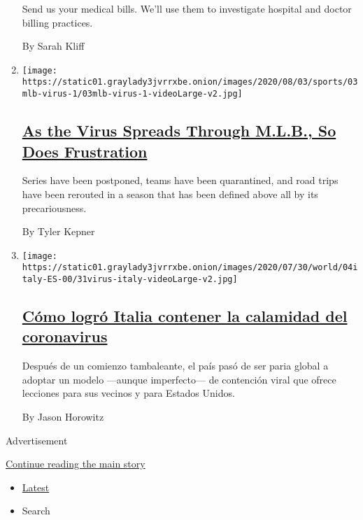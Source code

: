 \begin{enumerate}
  Send us your medical bills. We'll use them to investigate hospital and
  doctor billing practices.

  By Sarah Kliff
\item
  \texttt{[image: https://static01.graylady3jvrrxbe.onion/images/2020/08/03/sports/03mlb-virus-1/03mlb-virus-1-videoLarge-v2.jpg]}

  \hypertarget{as-the-virus-spreads-through-mlb-so-does-frustration}{%
  \subsection{\texorpdfstring{\href{/2020/08/03/sports/baseball/mlb-coronavirus-outbreak.html}{As
  the Virus Spreads Through M.L.B., So Does
  Frustration}}{As the Virus Spreads Through M.L.B., So Does Frustration}}\label{as-the-virus-spreads-through-mlb-so-does-frustration}}

  Series have been postponed, teams have been quarantined, and road
  trips have been rerouted in a season that has been defined above all
  by its precariousness.

  By Tyler Kepner
\item
  \texttt{[image: https://static01.graylady3jvrrxbe.onion/images/2020/07/30/world/04italy-ES-00/31virus-italy-videoLarge-v2.jpg]}

  \hypertarget{cuxf3mo-logruxf3-italia-contener-la-calamidad-del-coronavirus}{%
  \subsection{\texorpdfstring{\href{/es/2020/08/05/espanol/mundo/italia-reapertura-coronavirus.html}{Cómo
  logró Italia contener la calamidad del
  coronavirus}}{Cómo logró Italia contener la calamidad del coronavirus}}\label{cuxf3mo-logruxf3-italia-contener-la-calamidad-del-coronavirus}}

  Después de un comienzo tambaleante, el país pasó de ser paria global a
  adoptar un modelo ---aunque imperfecto--- de contención viral que
  ofrece lecciones para sus vecinos y para Estados Unidos.

  By Jason Horowitz
\end{enumerate}

Advertisement

\protect\hyperlink{after-mid2}{Continue reading the main story}

\begin{itemize}
\tightlist
\item
  \protect\hyperlink{stream-panel}{Latest}
\item
  Search
\end{itemize}

